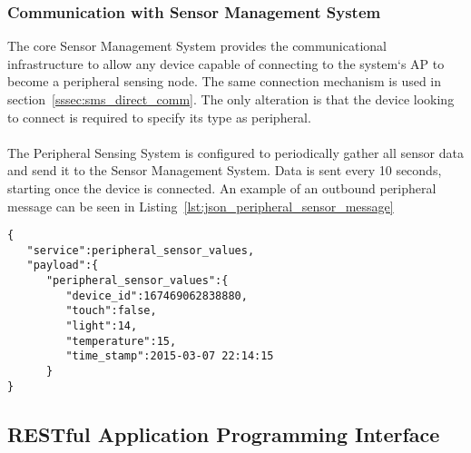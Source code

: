 \documentclass{article}
\begin{document}
\subsubsection{Communication with Sensor Management System}
The core Sensor Management System provides the communicational infrastructure to allow any device capable of connecting to the system\lq s AP to become a peripheral sensing node. The same connection mechanism is used in section~\ref{sssec:sms_direct_comm}. The only alteration is that the device looking to connect is required to specify its type as peripheral. \\\\
The Peripheral Sensing System is configured to periodically gather all sensor data and send it to the Sensor Management System. Data is sent every 10 seconds, starting once the device is connected. An example of an outbound peripheral message can be seen in Listing~\ref{lst:json_peripheral_sensor_message}

\begin{lstlisting}[caption={JSON Peripheral Sensor Readings Message Object},label={lst:json_peripheral_sensor_message}]
{  
   "service":peripheral_sensor_values,
   "payload":{  
      "peripheral_sensor_values":{  
      	 "device_id":167469062838880,
         "touch":false,
         "light":14,
         "temperature":15,
         "time_stamp":2015-03-07 22:14:15
      }
}
\end{lstlisting}

\newpage

\subsection{RESTful Application Programming Interface}
\end{document}
